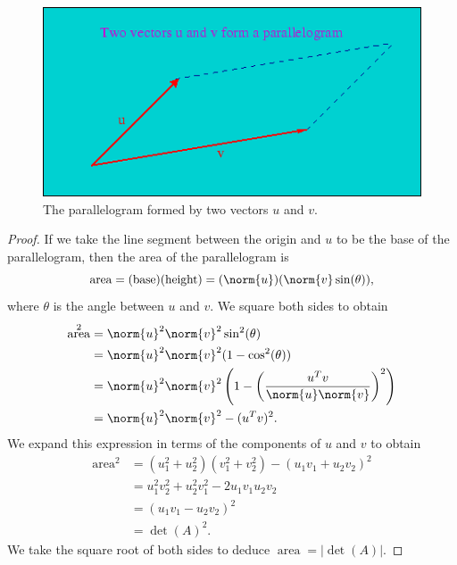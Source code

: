 \documentclass[preprint]{imsart}
\numberwithin{equation}{section}
\numberwithin{equation}{section}
\theoremstyle{plain}
\DeclareMathOperator{\area}{area}
\DeclareMathOperator{\base}{base}
\DeclareMathOperator{\height}{height}
\begin{document}
\begin{figure}
  \includegraphics[scale=0.75]{parallelogram}
  \caption{The parallelogram formed by two vectors $u$ and $v$.}
  \label{fig:parallelogram}
\end{figure}

\begin{proof}
If we take the line segment between the origin and $u$ to be the base of the parallelogram, then the area of the parallelogram is
$$
\area = (\base)(\height) = (\norm{u})(\norm{v}\sin(\theta)),
$$
where $\theta$ is the angle between $u$ and $v$. We square both sides to obtain
\begin{align*}
\area^2 &= \norm{u}^2\norm{v}^2\sin^2(\theta) \\
&= \norm{u}^2\norm{v}^2(1 - \cos^2(\theta)) \\
&= \norm{u}^2\norm{v}^2\left(1 - \left(\frac{u^Tv}{\norm{u}\norm{v}}\right)^2\right) \\
&= \norm{u}^2\norm{v}^2 - (u^Tv)^2.
\end{align*}
We expand this expression in terms of the components of $u$ and $v$ to obtain
\begin{align*}
\area^2 &= (u_1^2 + u_2^2)(v_1^2 + v_2^2) - (u_1v_1 + u_2v_2)^2 \\
&= u_1^2v_2^2 + u_2^2v_1^2 - 2u_1v_1u_2v_2 \\
&= (u_1v_1 - u_2v_2)^2 \\
&= \det(A)^2.
\end{align*}
We take the square root of both sides to deduce $\area = |\det(A)|$.
\end{proof}
\end{document}
